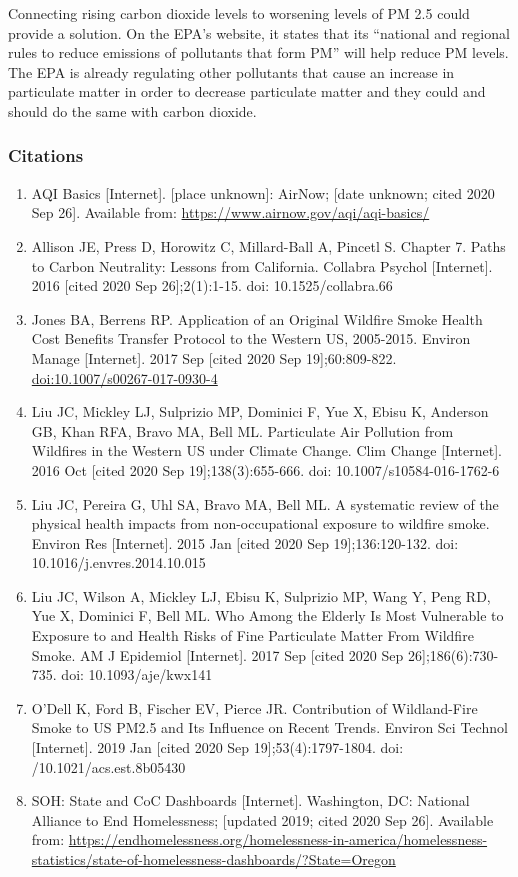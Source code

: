 \documentclass[]{article}
\providecommand{\tightlist}{%
  \setlength{\itemsep}{0pt}\setlength{\parskip}{0pt}}
\begin{document}
Connecting rising carbon dioxide levels to worsening levels of PM 2.5
could provide a solution. On the EPA's website, it states that its
``national and regional rules to reduce emissions of pollutants that
form PM'' will help reduce PM levels. The EPA is already regulating
other pollutants that cause an increase in particulate matter in order
to decrease particulate matter and they could and should do the same
with carbon dioxide.

\hypertarget{citations}{%
\subsubsection{Citations}\label{citations}}

\begin{enumerate}
\def\labelenumi{\arabic{enumi}.}
\tightlist
\item
  AQI Basics {[}Internet{]}. {[}place unknown{]}: AirNow; {[}date
  unknown; cited 2020 Sep 26{]}. Available from:
  \url{https://www.airnow.gov/aqi/aqi-basics/}
\item
  Allison JE, Press D, Horowitz C, Millard-Ball A, Pincetl S. Chapter 7.
  Paths to Carbon Neutrality: Lessons from California. Collabra Psychol
  {[}Internet{]}. 2016 {[}cited 2020 Sep 26{]};2(1):1-15. doi:
  10.1525/collabra.66
\item
  Jones BA, Berrens RP. Application of an Original Wildfire Smoke Health
  Cost Benefits Transfer Protocol to the Western US, 2005-2015. Environ
  Manage {[}Internet{]}. 2017 Sep {[}cited 2020 Sep 19{]};60:809-822.
  \url{doi:10.1007/s00267-017-0930-4}
\item
  Liu JC, Mickley LJ, Sulprizio MP, Dominici F, Yue X, Ebisu K, Anderson
  GB, Khan RFA, Bravo MA, Bell ML. Particulate Air Pollution from
  Wildfires in the Western US under Climate Change. Clim Change
  {[}Internet{]}. 2016 Oct {[}cited 2020 Sep 19{]};138(3):655-666. doi:
  10.1007/s10584-016-1762-6
\item
  Liu JC, Pereira G, Uhl SA, Bravo MA, Bell ML. A systematic review of
  the physical health impacts from non-occupational exposure to wildfire
  smoke. Environ Res {[}Internet{]}. 2015 Jan {[}cited 2020 Sep
  19{]};136:120-132. doi: 10.1016/j.envres.2014.10.015
\item
  Liu JC, Wilson A, Mickley LJ, Ebisu K, Sulprizio MP, Wang Y, Peng RD,
  Yue X, Dominici F, Bell ML. Who Among the Elderly Is Most Vulnerable
  to Exposure to and Health Risks of Fine Particulate Matter From
  Wildfire Smoke. AM J Epidemiol {[}Internet{]}. 2017 Sep {[}cited 2020
  Sep 26{]};186(6):730-735. doi: 10.1093/aje/kwx141
\item
  O'Dell K, Ford B, Fischer EV, Pierce JR. Contribution of Wildland-Fire
  Smoke to US PM2.5 and Its Influence on Recent Trends. Environ Sci
  Technol {[}Internet{]}. 2019 Jan {[}cited 2020 Sep
  19{]};53(4):1797-1804. doi: /10.1021/acs.est.8b05430
\item
  SOH: State and CoC Dashboards {[}Internet{]}. Washington, DC: National
  Alliance to End Homelessness; {[}updated 2019; cited 2020 Sep 26{]}.
  Available from:
  \url{https://endhomelessness.org/homelessness-in-america/homelessness-statistics/state-of-homelessness-dashboards/?State=Oregon}
\end{enumerate}
\end{document}
